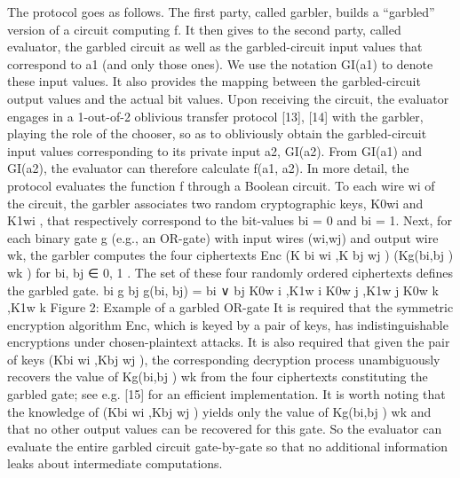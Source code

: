 The protocol goes as follows. The first party, called
garbler, builds a “garbled” version of a circuit computing f.
It then gives to the second party, called evaluator, the
garbled circuit as well as the garbled-circuit input values that
correspond to a1 (and only those ones). We use the notation
GI(a1) to denote these input values. It also provides the
mapping between the garbled-circuit output values and the
actual bit values. Upon receiving the circuit, the evaluator
engages in a 1-out-of-2 oblivious transfer protocol [13],
[14] with the garbler, playing the role of the chooser, so
as to obliviously obtain the garbled-circuit input values
corresponding to its private input a2, GI(a2). From GI(a1)
and GI(a2), the evaluator can therefore calculate f(a1, a2).
In more detail, the protocol evaluates the function f
through a Boolean circuit. To each wire wi of the circuit, the
garbler associates two random cryptographic keys, K0wi
and
K1wi
, that respectively correspond to the bit-values bi = 0
and bi = 1. Next, for each binary gate g (e.g., an OR-gate)
with input wires (wi,wj) and output wire wk, the garbler
computes the four ciphertexts
Enc
(K
bi
wi
,K
bj
wj )
(Kg(bi,bj )
wk ) for bi, bj ∈ {0, 1} .
The set of these four randomly ordered ciphertexts defines
the garbled gate.
bi g
bj
g(bi, bj) = bi ∨ bj
K0w
i
,K1w
i
K0w
j
,K1w
j
K0w
k
,K1w
k
Figure 2: Example of a garbled OR-gate
It is required that the symmetric encryption algorithm
Enc, which is keyed by a pair of keys, has indistinguishable
encryptions under chosen-plaintext attacks. It is also
required that given the pair of keys (Kbi
wi ,Kbj
wj ), the corresponding
decryption process unambiguously recovers the
value of Kg(bi,bj )
wk from the four ciphertexts constituting the
garbled gate; see e.g. [15] for an efficient implementation.
It is worth noting that the knowledge of (Kbi
wi ,Kbj
wj ) yields
only the value of Kg(bi,bj )
wk and that no other output values
can be recovered for this gate. So the evaluator can evaluate
the entire garbled circuit gate-by-gate so that no additional
information leaks about intermediate computations.